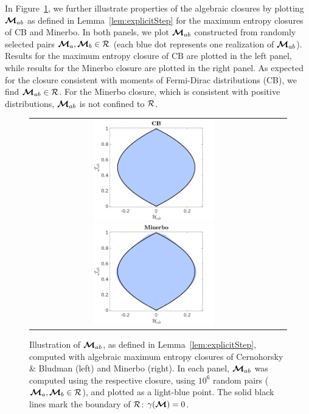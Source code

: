 In Figure~\ref{fig:MabWithDifferentClosure}, we further illustrate properties of the algebraic closures by plotting $\boldsymbol{\mathcal{M}}_{ab}$ as defined in Lemma~\ref{lem:explicitStep} for the maximum entropy closures of CB and Minerbo.  
In both panels, we plot $\boldsymbol{\mathcal{M}}_{ab}$ constructed from randomly selected pairs $\boldsymbol{\mathcal{M}}_{a},\boldsymbol{\mathcal{M}}_{b}\in\mathcal{R}$ (each blue dot represents one realization of $\boldsymbol{\mathcal{M}}_{ab}$).  
Results for the maximum entropy closure of CB are plotted in the left panel, while results for the Minerbo closure are plotted in the right panel.  
As expected for the closure consistent with moments of Fermi-Dirac distributions (CB), we find $\boldsymbol{\mathcal{M}}_{ab}\in\mathcal{R}$.  
For the Minerbo closure, which is consistent with positive distributions, $\boldsymbol{\mathcal{M}}_{ab}$ is not confined to $\mathcal{R}$.  
\begin{figure}[H]
  \centering
  \begin{tabular}{cc}
    \includegraphics[width=0.5\textwidth]{figures/MabWithCBME}
    \includegraphics[width=0.5\textwidth]{figures/MabWithMI}
  \end{tabular}
   \caption{Illustration of $\boldsymbol{\mathcal{M}}_{ab}$, as defined in Lemma~\ref{lem:explicitStep}, computed with algebraic maximum entropy closures of Cernohorsky \& Bludman (left) and Minerbo (right).  In each panel, $\boldsymbol{\mathcal{M}}_{ab}$ was computed using the respective closure, using $10^{6}$ random pairs ($\boldsymbol{\mathcal{M}}_{a},\boldsymbol{\mathcal{M}}_{b}\in\mathcal{R}$), and plotted as a light-blue point.  The solid black lines mark the boundary of $\mathcal{R}$: $\gamma(\boldsymbol{\mathcal{M}}) = 0$.}
  \label{fig:MabWithDifferentClosure}
\end{figure}